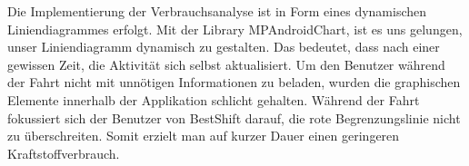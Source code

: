 Die Implementierung der Verbrauchsanalyse ist in Form eines dynamischen Liniendiagrammes erfolgt.
Mit der Library MPAndroidChart, ist es uns gelungen, unser Liniendiagramm dynamisch zu gestalten.
Das bedeutet, dass nach einer gewissen Zeit, die Aktivität sich selbst aktualisiert.
Um den Benutzer während der Fahrt nicht mit unnötigen Informationen zu beladen, wurden die graphischen Elemente innerhalb der Applikation schlicht gehalten.\nextline
Während der Fahrt fokussiert sich der Benutzer von BestShift darauf, die rote Begrenzungslinie nicht zu überschreiten.
Somit erzielt man auf kurzer Dauer einen geringeren Kraftstoffverbrauch.


\clearpage %